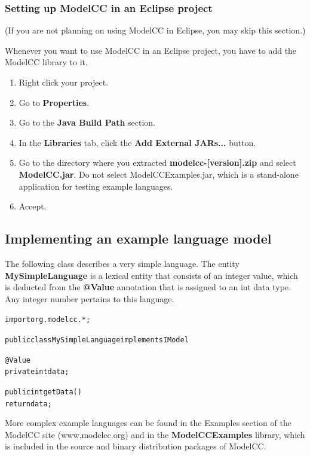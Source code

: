 \documentclass[a4paper,twoside,onecolumn]{article}
\newenvironment{colframe}{%
  \begin{Sbox} 
    \begin{minipage}{.8\columnwidth} 
}{%

  \end{minipage} 
  \end{Sbox} 
  \begin{center} 
    \fcolorbox{black}{MyGray}{\TheSbox} 
  \end{center} 
}
\begin{document}
\subsubsection{Setting up ModelCC in an Eclipse project}

(If you are not planning on using ModelCC in Eclipse, you may skip this section.)

Whenever you want to use ModelCC in an Eclipse project, you have to add the ModelCC library to it.

\begin{enumerate}
\item Right click your project.
\item Go to {\bf Properties}.
\item Go to the {\bf Java Build Path} section.
\item In the {\bf Libraries} tab, click the {\bf Add External JARs...} button.
\item Go to the directory where you extracted {\bf modelcc-[version].zip} and select {\bf ModelCC.jar}. Do not select ModelCCExamples.jar, which is a stand-alone application for testing example languages.
\item Accept.
\end{enumerate}

\subsection{Implementing an example language model} \label{sec:lang}

The following class describes a very simple language. The entity {\bf MySimpleLanguage} is a lexical entity that consists of an integer value, which is deducted from the {\bf @Value} annotation that is assigned to an int data type. Any integer number pertains to this language.

\begin{colframe}
\begin{alltt}
import org.modelcc.*;

public class MySimpleLanguage implements IModel {

    @Value
    private int data;    
    
    public int getData() {
        return data;
    }

}
\end{alltt}
\end{colframe}

More complex example languages can be found in the Examples section of the ModelCC site (www.modelcc.org) and in the {\bf ModelCCExamples} library, which is included in the source and binary distribution packages of ModelCC.
\end{document}

